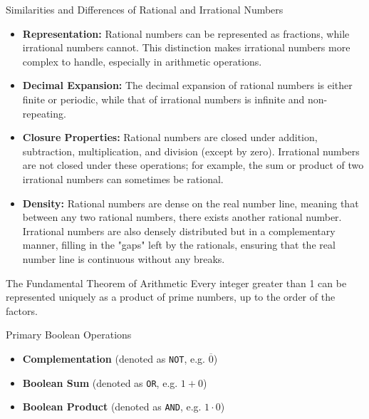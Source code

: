 \begin{custombox}{Similarities and Differences of Rational and Irrational Numbers}
    \begin{itemize}
    \item \textbf{Representation:} Rational numbers can be represented as fractions, while irrational numbers cannot. This distinction makes irrational numbers more complex to handle, especially in arithmetic operations.

    \item \textbf{Decimal Expansion:} The decimal expansion of rational numbers is either finite or periodic, while that of irrational numbers is infinite and non-repeating.

    \item \textbf{Closure Properties:} Rational numbers are closed under addition, subtraction, multiplication, and division (except by zero). Irrational numbers are not closed under these operations; for example, the sum or product of two irrational numbers can sometimes be rational.

    \item \textbf{Density:} Rational numbers are dense on the real number line, meaning that between any two rational numbers, there exists another rational number. Irrational numbers are also densely distributed but in a complementary manner, filling in the "gaps" left by the rationals, ensuring that the real number line is continuous without any breaks.
\end{itemize}
\end{custombox}

\begin{theorem}{The Fundamental Theorem of Arithmetic}
Every integer greater than 1 can be represented uniquely as a product of prime numbers, up to the order of the factors.
\end{theorem}


\begin{custombox}{Primary Boolean Operations}
    

\begin{itemize}
    \item \textbf{Complementation} (denoted as \texttt{NOT}, e.g. $\overline{0}$)
    \item \textbf{Boolean Sum} (denoted as \texttt{OR}, e.g. $1 + 0$)
    \item \textbf{Boolean Product} (denoted as \texttt{AND}, e.g. $1 \cdot 0$)
\end{itemize}
\end{custombox}

